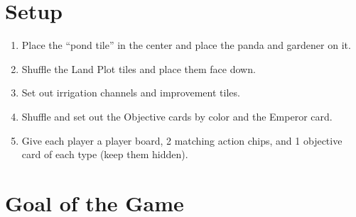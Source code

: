\documentclass[12pt]{article}
\newenvironment{enumerateCustom}
{\begin{enumerate}
  \setlength{\itemsep}{1pt}
  \setlength{\parskip}{0pt}
  \setlength{\parsep}{0pt}}
{\end{enumerate}}
\begin{document}
\begin{mdframed}[style = customFrame]
\begin{multicols*}{2}

\section*{Setup}
\begin{enumerateCustom}
	\item Place the ``pond tile'' in the center and place the panda and gardener on it.
	\item Shuffle the Land Plot tiles and place them face down.
	\item Set out irrigation channels and improvement tiles.
	\item Shuffle and set out the Objective cards by color and the Emperor card.
	\item Give each player a player board, 2 matching action chips, and 1 objective card of each type (keep them hidden).
\end{enumerateCustom}

\section*{Goal of the Game}

\end{multicols*}
\end{mdframed}
\end{document}
